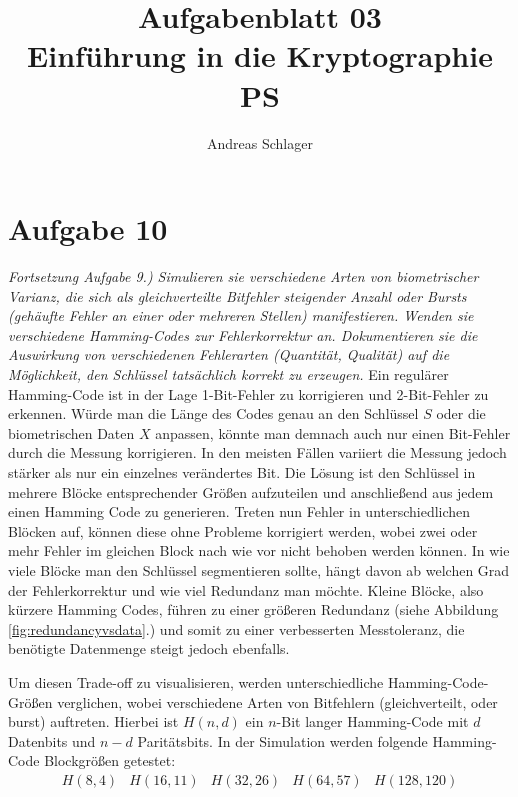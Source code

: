 \documentclass{article}
\title{{\Huge Aufgabenblatt 03}\\Einführung in die Kryptographie PS}
\author{Andreas Schlager}
\begin{document}
    \pagestyle{fancy}
    \fancyhead{}
    \fancyfoot{}
    \fancyfoot[R]{\thepage}
    \maketitle
    \tableofcontents
    \section{Aufgabe 10}
    \textit{Fortsetzung Aufgabe 9.) Simulieren sie verschiedene Arten von biometrischer Varianz, 
    die sich als gleichverteilte Bitfehler steigender Anzahl oder Bursts (gehäufte
    Fehler an einer oder mehreren Stellen) manifestieren. Wenden sie verschiedene
    Hamming-Codes zur Fehlerkorrektur an. Dokumentieren sie die Auswirkung von
    verschiedenen Fehlerarten (Quantität, Qualität) auf die Möglichkeit, den Schlüssel
    tatsächlich korrekt zu erzeugen.}\vspace*{1em}\newline
    Ein regulärer Hamming-Code ist in der Lage 1-Bit-Fehler zu korrigieren und 2-Bit-Fehler zu erkennen.
    Würde man die Länge des Codes genau an den Schlüssel $S$ oder die biometrischen Daten $X$ anpassen,
    könnte man demnach auch nur einen Bit-Fehler durch die Messung korrigieren. In den meisten Fällen variiert die Messung
    jedoch stärker als nur ein einzelnes verändertes Bit. Die Lösung ist den Schlüssel in mehrere Blöcke
    entsprechender Größen aufzuteilen und anschließend aus jedem einen Hamming Code zu generieren. Treten 
    nun Fehler in unterschiedlichen Blöcken auf, können diese ohne Probleme korrigiert werden, wobei
    zwei oder mehr Fehler im gleichen Block nach wie vor nicht behoben werden können. In wie viele Blöcke man 
    den Schlüssel segmentieren sollte, hängt davon ab welchen Grad der Fehlerkorrektur und wie viel Redundanz
    man möchte. Kleine Blöcke, also kürzere Hamming Codes, führen zu einer größeren Redundanz 
    (siehe Abbildung \ref{fig:redundancyvsdata}.) und somit zu einer verbesserten Messtoleranz, 
    die benötigte Datenmenge steigt jedoch ebenfalls.
    
    

    Um diesen Trade-off zu visualisieren, werden unterschiedliche Hamming-Code-Größen verglichen, wobei verschiedene
    Arten von Bitfehlern (gleichverteilt, oder burst) auftreten. Hierbei ist $H(n, d)$ ein $n$-Bit langer Hamming-Code
    mit $d$ Datenbits und $n-d$ Paritätsbits.
    In der Simulation werden folgende Hamming-Code Blockgrößen getestet:
    \[
        \begin{array}{ccccc}
            H(8,4) & H(16,11) & H(32,26) & H(64,57) & H(128,120)
        \end{array}
    \]
\end{document}
